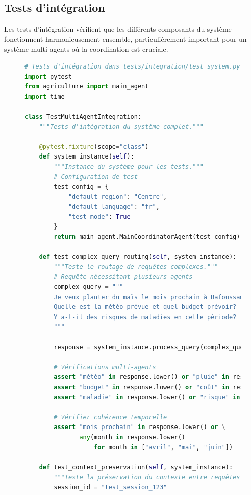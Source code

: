 \subsection{Tests d'intégration}

Les tests d'intégration vérifient que les différents composants du système fonctionnent harmonieusement ensemble, particulièrement important pour un système multi-agents où la coordination est cruciale.

\begin{figure}[H]
\centering
\begin{lstlisting}[language=Python, caption=Suite de tests d'intégration]
# Tests d'intégration dans tests/integration/test_system.py
import pytest
from agriculture import main_agent
import time

class TestMultiAgentIntegration:
    """Tests d'intégration du système complet."""

    @pytest.fixture(scope="class")
    def system_instance(self):
        """Instance du système pour les tests."""
        # Configuration de test
        test_config = {
            "default_region": "Centre",
            "default_language": "fr",
            "test_mode": True
        }
        return main_agent.MainCoordinatorAgent(test_config)

    def test_complex_query_routing(self, system_instance):
        """Teste le routage de requêtes complexes."""
        # Requête nécessitant plusieurs agents
        complex_query = """
        Je veux planter du maïs le mois prochain à Bafoussam.
        Quelle est la météo prévue et quel budget prévoir?
        Y a-t-il des risques de maladies en cette période?
        """

        response = system_instance.process_query(complex_query)

        # Vérifications multi-agents
        assert "météo" in response.lower() or "pluie" in response.lower()
        assert "budget" in response.lower() or "coût" in response.lower()
        assert "maladie" in response.lower() or "risque" in response.lower()

        # Vérifier cohérence temporelle
        assert "mois prochain" in response.lower() or \
               any(month in response.lower()
                   for month in ["avril", "mai", "juin"])

    def test_context_preservation(self, system_instance):
        """Teste la préservation du contexte entre requêtes."""
        session_id = "test_session_123"


\end{lstlisting}
\end{figure}
